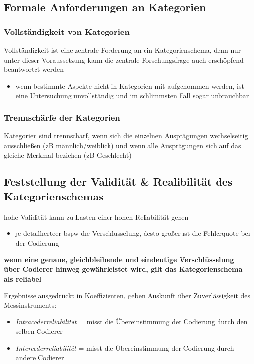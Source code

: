 \documentclass[11pt]{article}
\begin{document}
\subsection{Formale Anforderungen an Kategorien}
\label{sec:orgd158651}
\subsubsection{Vollständigkeit von Kategorien}
\label{sec:orgebe9a3e}
Vollständigkeit ist eine zentrale Forderung an ein Kategorienschema, denn nur unter dieser Voraussetzung kann die zentrale Forschungsfrage auch erschöpfend beantwortet werden
\begin{itemize}
\item wenn bestimmte Aspekte nicht in Kategorien mit aufgenommen werden, ist eine Untersuchung unvollständig und im schlimmsten Fall sogar unbrauchbar
\end{itemize}
\subsubsection{Trennschärfe der Kategorien}
\label{sec:orgbd914c8}
Kategorien sind trennscharf, wenn sich die einzelnen Ausprägungen wechselseitig ausschließen (zB männlich/weiblich) und wenn alle Ausprägungen sich auf das gleiche Merkmal beziehen (zB Geschlecht)
\subsection{Feststellung der Validität \& Realibilität des Kategorienschemas}
\label{sec:orgaebbcf9}
hohe Validität kann zu Lasten einer hohen Reliabilität gehen
\begin{itemize}
\item je detaillierteer bspw die Verschlüsselung, desto größer ist die Fehlerquote bei der Codierung
\end{itemize}

\textbf{\textbf{wenn eine genaue, gleichbleibende und eindeutige Verschlüsselung über Codierer hinweg gewährleistet wird, gilt das Kategorienschema als reliabel}}

Ergebnisse ausgedrückt in Koeffizienten, geben Auskunft über Zuverlässigkeit des Messinstruments:
\begin{itemize}
\item \emph{Intracoderreliabilität} = misst die Übereinstimmung der Codierung durch den selben Codierer
\item \emph{Intercoderreliabilität} = misst die Übereinstimmung der Codierung durch andere Codierer
\end{itemize}
\end{document}
